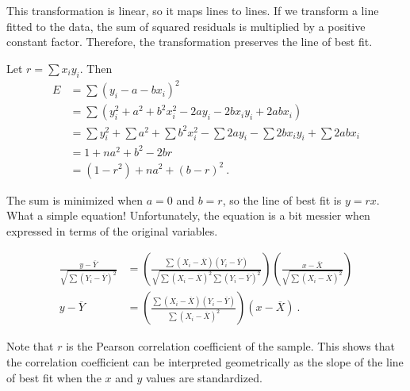 \documentclass{article}
\begin{document}
This transformation is linear, so it maps lines to lines.
If we transform a line fitted to the data,
the sum of squared residuals is multiplied by a positive constant factor.
Therefore, the transformation preserves the line of best fit.


Let $r = \sum x_i y_i$. Then
\begin{align*}
E &= \sum (y_i - a - bx_i)^2 \\
&= \sum (y_i^2 + a^2 + b^2 x_i^2 - 2ay_i - 2bx_iy_i + 2abx_i) \\
&= \sum y_i^2 + \sum a^2 + \sum b^2 x_i^2 
 - \sum 2ay_i - \sum 2bx_iy_i + \sum 2abx_i \\
&= 1 + na^2 + b^2 - 2br \\
&= (1-r^2) + na^2 + (b - r)^2\ .
\end{align*}

The sum is minimized when $a = 0$ and $b = r$, so the line of best fit is
$y = rx$. What a simple equation!
Unfortunately, the equation is a bit messier when expressed in terms of the
original variables.

\begin{align*}
\frac{y - \overline{Y}}{\sqrt{\sum (Y_i - \overline{Y})^2}}
&= \left(
     \frac{\sum (X_i - \overline{X}) (Y_i - \overline{Y})}
          {\sqrt{\sum (X_i - \overline{X})^2 \sum (Y_i - \overline{Y})^2}}
   \right)
   \left(
     \frac{x - \overline{X}}
          {\sqrt{\sum (X_i - \overline{X})^2}}
   \right)\\
y - \overline{Y} &=
\left(
     \frac{\sum (X_i - \overline{X}) (Y_i - \overline{Y})}
          {\sum (X_i - \overline{X})^2}
   \right)
   (x - \overline{X})\ .
\end{align*}

Note that $r$ is the Pearson correlation coefficient of the sample.
This shows that the correlation coefficient can be interpreted geometrically
as the slope of the line of best fit when the $x$ and $y$ values are standardized.
\fi
 
\end{document}
